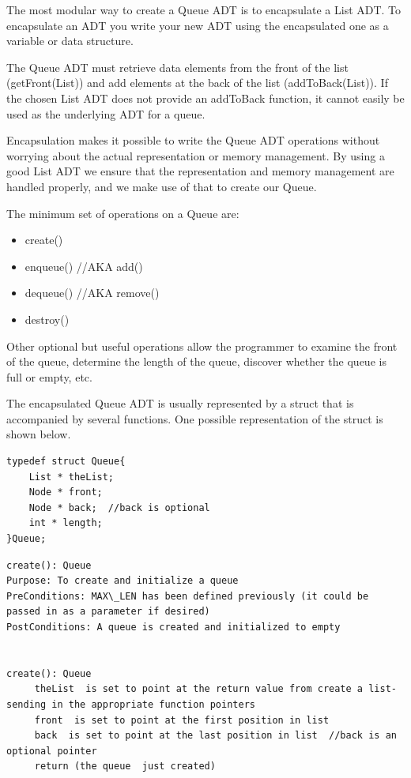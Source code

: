 The most modular way to create a Queue ADT is to encapsulate a List ADT. To encapsulate an ADT you write your new ADT using the encapsulated one as a variable or data structure.

The Queue ADT must retrieve data elements from the front of the list (getFront(List)) and add elements at the back of the list (addToBack(List)).    If the chosen List ADT does not provide an addToBack function,  it cannot easily be used as the underlying ADT for a queue. 

 Encapsulation makes it possible to write the Queue ADT operations without worrying about the actual representation or memory management.  By using a good List ADT we ensure that the representation and memory management are handled properly, and we  make use of that to create our Queue.



The minimum set of operations on a Queue are:
\begin{itemize}
\item create()
\item enqueue()  //AKA add()
\item dequeue() //AKA remove()
\item destroy()
\end{itemize}


Other optional but useful operations allow the programmer to examine the front of the queue, determine the length of the queue, discover whether the queue is full or empty, etc.

The encapsulated Queue ADT is usually represented by a struct that is accompanied by several functions.  One possible representation of the struct is shown below.

\begin{lstlisting}
typedef struct Queue{
    List * theList;
    Node * front;
    Node * back;  //back is optional
    int * length;
}Queue;
\end{lstlisting}




\begin{lstlisting}
create(): Queue
Purpose: To create and initialize a queue
PreConditions: MAX\_LEN has been defined previously (it could be passed in as a parameter if desired)
PostConditions: A queue is created and initialized to empty


create(): Queue
     theList  is set to point at the return value from create a list- sending in the appropriate function pointers
     front  is set to point at the first position in list
     back  is set to point at the last position in list  //back is an optional pointer
     return (the queue  just created)
\end{lstlisting}




